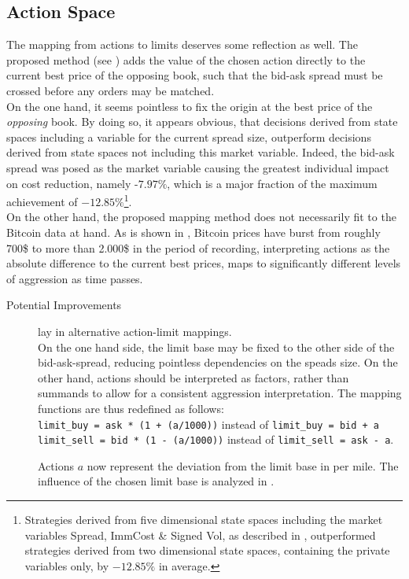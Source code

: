 \subsection{Action Space}
\label{chap:backwardalgorithm:discussion:actionspace}
The mapping from actions to limits deserves some reflection as well. The proposed method (see ) adds the value of the chosen action directly to the current best price of the opposing book, such that the bid-ask spread must be crossed before any orders may be matched.\\

On the one hand, it seems pointless to fix the origin at the best price of the \emph{opposing} book. By doing so, it appears obvious, that decisions derived from state spaces including a variable for the current spread size, outperform decisions derived from state spaces not including this market variable. Indeed, the  bid-ask spread was posed as the market variable causing the greatest individual impact on cost reduction, namely -$7.97\%$, which is a major fraction of the maximum achievement of  $-12.85\%$\footnote{Strategies derived from five dimensional state spaces including the market variables Spread, ImmCost \& Signed Vol, as described in , outperformed strategies derived from two dimensional state spaces, containing the private variables only, by $-12.85\%$ in average.}.\\

On the other hand, the proposed mapping method does not necessarily fit to the Bitcoin data at hand. As is shown in , Bitcoin prices have burst from roughly 700\$ to more than 2.000\$ in the period of recording, \ie interpreting actions as the absolute difference to the current best prices, maps to significantly different levels of aggression as time passes.


\begin{description}
\item[Potential Improvements] lay in alternative action-limit mappings.\\
On the one hand side, the limit base may be fixed to the other side of the bid-ask-spread, reducing pointless dependencies on the speads size. On the other hand, actions should be interpreted as factors, rather than summands to allow for a consistent aggression interpretation. 
The mapping functions are thus redefined as follows:\\
\lstinline!limit_buy = ask * (1 + (a/1000))! instead of \lstinline!limit_buy = bid + a!\\
\lstinline!limit_sell = bid * (1 - (a/1000))! instead of \lstinline!limit_sell = ask - a!.

Actions $a$ now represent the deviation from the limit base in per mile. The influence of the chosen limit base is analyzed in .
\end{description}




\cleardoublepage{}